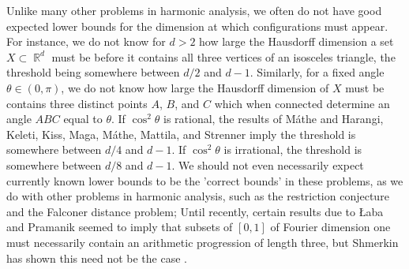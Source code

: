 \documentclass[11pt]{article}
\DeclareMathOperator{\QQ}{\mathbb{Q}}
\DeclareMathOperator{\RR}{\mathbb{R}}
\begin{document}
Unlike many other problems in harmonic analysis, we often do not have good expected lower bounds for the dimension at which configurations must appear.
%
For instance, we do not know for $d > 2$ how large the Hausdorff dimension a set $X \subset \RR^d$ must be before it contains all three vertices of an isosceles triangle, the threshold being somewhere between $d/2$ and $d-1$. Similarly, for a fixed angle $\theta \in (0,\pi)$, we do not know how large the Hausdorff dimension of $X$ must be contains three distinct points $A$, $B$, and $C$ which when connected determine an angle $ABC$ equal to $\theta$. If $\cos^2 \theta$ is rational, the results of M\'{a}the \cite{Mathe} and Harangi, Keleti, Kiss, Maga, M\'{a}the, Mattila, and Strenner \cite{Harangi} imply the threshold is somewhere between $d/4$  and $d-1$. If $\cos^2 \theta$ is irrational, the threshold is somewhere between $d/8$ and $d-1$. 
We should not even necessarily expect currently known lower bounds to be the 'correct bounds' in these problems, as we do with other problems in harmonic analysis, such as the restriction conjecture and the Falconer distance problem; Until recently, certain results due to {\L}aba and Pramanik \cite{LabaPramanik} seemed to imply that subsets of $[0,1]$ of Fourier dimension one must necessarily contain an arithmetic progression of length three, but Shmerkin has shown this need not be the case \cite{Shmerkin}.
\end{document}
